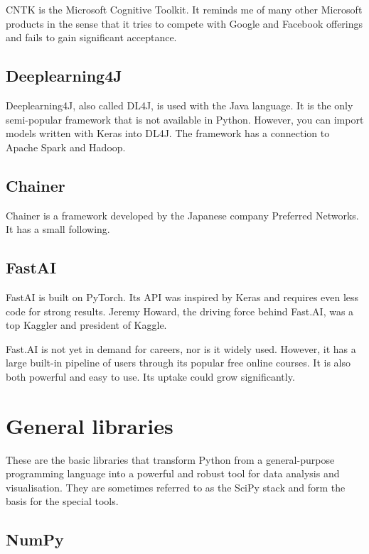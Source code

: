 CNTK is the Microsoft Cognitive Toolkit. It reminds me of many other Microsoft products in the sense that it tries to compete with Google and Facebook offerings and fails to gain significant acceptance. \cite{CNTK:2020}

\subsection{Deeplearning4J}

Deeplearning4J, also called DL4J, is used with the Java language. It is the only semi-popular framework that is not available in Python. However, you can import models written with Keras into DL4J. The framework has a connection to Apache Spark and Hadoop. \cite{Deeplearning4J:2020}


\subsection{Chainer}

Chainer is a framework developed by the Japanese company Preferred Networks. It has a small following. \cite{Chainer:2020}

\subsection{FastAI}

FastAI is built on PyTorch. Its API was inspired by Keras and requires even less code for strong results.  Jeremy Howard, the driving force behind Fast.AI, was a top Kaggler and president of Kaggle. \cite{FastAI:2020}

Fast.AI is not yet in demand for careers, nor is it widely used. However, it has a large built-in pipeline of users through its popular free online courses. It is also both powerful and easy to use. Its uptake could grow significantly.

\section{General libraries}

These are the basic libraries that transform Python from a general-purpose programming language into a powerful and robust tool for data analysis and visualisation. They are sometimes referred to as the SciPy stack and form the basis for the special tools.


\subsection{NumPy}


